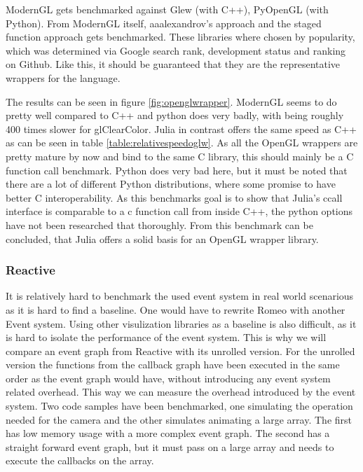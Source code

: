 ModernGL gets benchmarked against Glew (with C++), PyOpenGL (with Python). From ModernGL itself, aaalexandrov's approach and the staged function approach gets benchmarked.
These libraries where chosen by popularity, which was determined via Google search rank, development status and ranking on Github.
Like this, it should be guaranteed that they are the representative wrappers for the language.

The results can be seen in figure \ref{fig:openglwrapper}.
ModernGL seems to do pretty well compared to C++ and python does very badly, with being roughly 400 times slower for glClearColor.
Julia in contrast offers the same speed as C++ as can be seen in table \ref{table:relativespeedoglw}.
As all the OpenGL wrappers are pretty mature by now and bind to the same C library, this should mainly be a C function call benchmark.
Python does very bad here, but it must be noted that there are a lot of different Python distributions, where some promise to have better C interoperability. 
As this benchmarks goal is to show that Julia's ccall interface is comparable to a c function call from inside C++, the python options have not been researched that thoroughly.
From this benchmark can be concluded, that Julia offers a solid basis for an \ac{OpenGL} wrapper library.

\subsubsection{Reactive}

It is relatively hard to benchmark the used event system in real world scenarious as it is hard to find a baseline.
One would have to rewrite Romeo with another Event system. Using other visulization libraries as a baseline is also difficult, as it is hard to isolate the performance of the event system.
This is why we will compare an event graph from Reactive with its unrolled version.
For the unrolled version the functions from the callback graph have been executed in the same order as the event graph would have, without introducing any event system related overhead.
This way we can measure the overhead introduced by the event system.
Two code samples have been benchmarked, one simulating the operation needed for the camera and the other simulates animating a large array.
The first has low memory usage with a more complex event graph. The second has a straight forward event graph, but it must pass on a large array and needs to execute the callbacks on the array.

